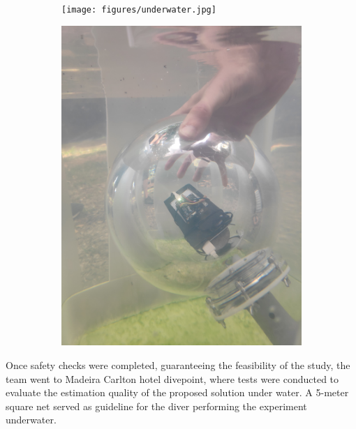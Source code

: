 \begin{figure}[!h]
    \centering
    \begin{subfigure}{0.30\textwidth}
        \centering
        \texttt{[image: figures/underwater.jpg]}
        \caption{  }
        \label{fig:underwater}
    \end{subfigure}
    \begin{subfigure}{0.30\textwidth}
        \centering
        \includegraphics[width=1\textwidth]{figures/underwater_1.jpg}
        \caption{  }
        \label{fig:underwater_1}
    \end{subfigure}
\end{figure}

Once safety checks were completed, guaranteeing the feasibility of the study, the team went to Madeira Carlton hotel divepoint, where tests were conducted to evaluate the estimation quality of the proposed solution under water. A 5-meter square net served as guideline for the diver performing the experiment underwater.

